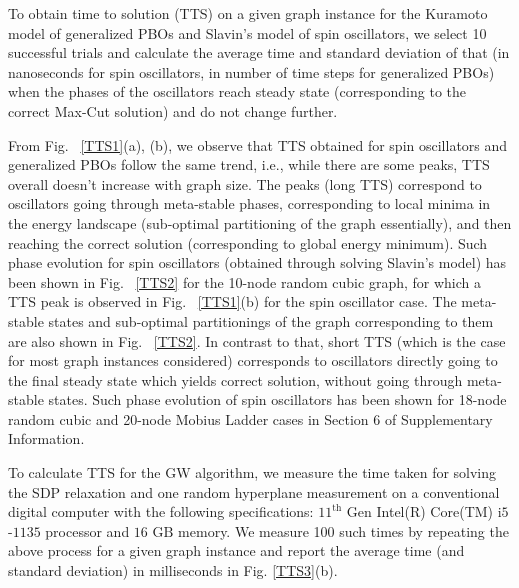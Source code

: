 \documentclass[10pt]{article}
\begin{document}
To obtain time to solution (TTS) on a given graph instance for the Kuramoto model of generalized PBOs and Slavin's model of spin oscillators, we select 10 successful trials and calculate the average time and standard deviation of that  (in nanoseconds for spin oscillators, in number of time steps for generalized PBOs) when the phases of the oscillators reach steady state (corresponding to the correct Max-Cut solution) and do not change further.

From Fig. ~\ref{TTS1}(a), (b), we observe that TTS obtained for spin oscillators and generalized PBOs follow the same trend, i.e., while there are some peaks, TTS overall doesn't increase with graph size. The peaks (long TTS) correspond to oscillators going through meta-stable phases, corresponding to local minima in the energy landscape (sub-optimal partitioning of the graph essentially), and then reaching the correct solution (corresponding to global energy minimum). Such phase evolution for spin oscillators (obtained through solving Slavin's model) has been shown in Fig. ~\ref{TTS2} for the 10-node random cubic graph, for which a TTS peak is observed in Fig. ~\ref{TTS1}(b) for the spin oscillator case.  The meta-stable states and sub-optimal partitionings of the graph corresponding to them are also shown in Fig. ~\ref{TTS2}. In contrast to that, short TTS (which is the case for most graph instances considered) corresponds to oscillators directly going to the final steady state which yields correct solution, without going through meta-stable states. Such phase evolution of spin oscillators has been shown for 18-node random cubic and 20-node Mobius Ladder cases in Section 6 of Supplementary Information.






To calculate TTS for the GW algorithm, we measure the time taken for solving the SDP relaxation and one random hyperplane measurement on a conventional digital computer with the following specifications: $11^{\mathrm{th}}$ Gen Intel(R) Core(TM) $\mathrm{i}5$-$1135$ processor and $16$ $\mathrm{GB}$ memory. We measure 100 such times by repeating the above process for a given graph instance and report the average time (and standard deviation) in milliseconds in Fig. \ref{TTS3}(b). 
\end{document}
